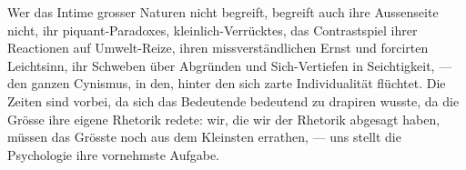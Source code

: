 Wer das Intime grosser Naturen nicht begreift, begreift auch ihre Aussenseite nicht, ihr piquant-Paradoxes, kleinlich-Verrücktes, das Contrastspiel ihrer Reactionen auf Umwelt-Reize, ihren missverständlichen Ernst und forcirten Leichtsinn, ihr Schweben über Abgründen und Sich-Vertiefen in Seichtigkeit, — den ganzen Cynismus, in den, hinter den sich zarte Individualität flüchtet. Die Zeiten sind vorbei, da sich das Bedeutende bedeutend zu drapiren wusste, da die Grösse ihre eigene Rhetorik redete: wir, die wir der Rhetorik abgesagt haben, müssen das Grösste noch aus dem Kleinsten errathen, — uns stellt die Psychologie ihre vornehmste Aufgabe.
\par

